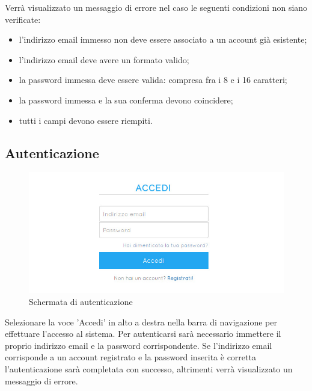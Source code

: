 \documentclass[a4paper, titlepage]{article}
\begin{document}
	Verrà visualizzato un messaggio di errore nel caso le seguenti condizioni non siano verificate:
	\begin{itemize}
		\item l'indirizzo email immesso non deve essere associato a un account già esistente;
		\item l'indirizzo email deve avere un formato valido;
		\item la password immessa deve essere valida: compresa fra i 8 e i 16 caratteri;
		\item la password immessa e la sua conferma devono coincidere;
		\item tutti i campi devono essere riempiti.
	\end{itemize}
	
	
	\subsection{Autenticazione}
	\begin{figure}[!h]
		\centering
		\includegraphics[scale=0.5]{Img/screen_Login.png}
		\caption{Schermata di autenticazione}
	\end{figure}
	Selezionare la voce 'Accedi' in alto a destra nella barra di navigazione per effettuare l'accesso al sistema. Per autenticarsi sarà necessario immettere il proprio indirizzo email e la password corrispondente. Se l'indirizzo email corrisponde a un account registrato e la password inserita è corretta l'autenticazione sarà completata con successo, altrimenti verrà visualizzato un messaggio di errore.
	
	\newpage
	\hypertarget{anc1}{ }
\end{document}
